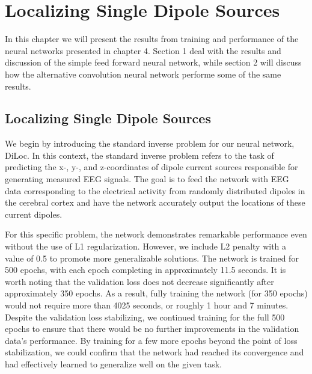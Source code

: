 \documentclass[a4paper, UKenglish, 11pt]{uiomaster}
\begin{document}
\chapter{Localizing Single Dipole Sources}

In this chapter we will present the results from training and performance of the neural networks presented in chapter 4. Section 1 deal with the results and discussion of the simple feed forward neural network, while section 2 will discuss how the alternative convolution neural network performe some of the same results.

\section{Localizing Single Dipole Sources}

We begin by introducing the standard inverse problem for our neural network, DiLoc. In this context, the standard inverse problem refers to the task of predicting the x-, y-, and z-coordinates of dipole current sources responsible for generating measured EEG signals. The goal is to feed the network with EEG data corresponding to the electrical activity from randomly distributed dipoles in the cerebral cortex and have the network accurately output the locations of these current dipoles.

For this specific problem, the network demonstrates remarkable performance even without the use of L1 regularization. However, we include L2 penalty with a value of 0.5 to promote more generalizable solutions. The network is trained for 500 epochs, with each epoch completing in approximately 11.5 seconds. It is worth noting that the validation loss does not decrease significantly after approximately 350 epochs. As a result, fully training the network (for 350 epochs) would not require more than 4025 seconds, or roughly 1 hour and 7 minutes. Despite the validation loss stabilizing, we continued training for the full 500 epochs to ensure that there would be no further improvements in the validation data's performance. By training for a few more epochs beyond the point of loss stabilization, we could confirm that the network had reached its convergence and had effectively learned to generalize well on the given task.
\end{document}
